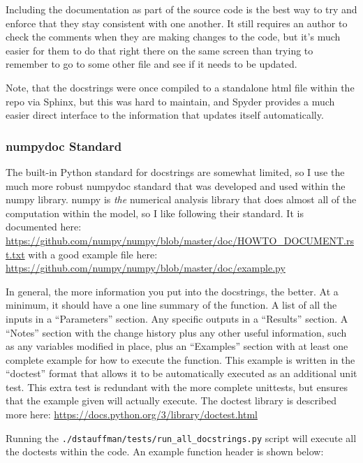 \documentclass[12pt]{article}
\begin{document}
Including the documentation as part of the source code is the best way to try and enforce that they stay consistent with one another.  It still requires an author to check the comments when they are making changes to the code, but it's much easier for them to do that right there on the same screen than trying to remember to go to some other file and see if it needs to be updated.

Note, that the docstrings were once compiled to a standalone html file within the repo via Sphinx, but this was hard to maintain, and Spyder provides a much easier direct interface to the information that updates itself automatically.

\subsubsection{numpydoc Standard}
The built-in Python standard for docstrings are somewhat limited, so I use the much more robust numpydoc standard that was developed and used within the numpy library.  numpy is \emph{the} numerical analysis library that does almost all of the computation within the model, so I like following their standard.  It is documented here: \url{https://github.com/numpy/numpy/blob/master/doc/HOWTO_DOCUMENT.rst.txt} with a good example file here: \url{https://github.com/numpy/numpy/blob/master/doc/example.py}

In general, the more information you put into the docstrings, the better.  At a minimum, it should have a one line summary of the function.  A list of all the inputs in a ``Parameters'' section.  Any specific outputs in a ``Results'' section.  A ``Notes'' section with the change history plus any other useful information, such as any variables modified in place, plus an ``Examples'' section with at least one complete example for how to execute the function.  This example is written in the ``doctest'' format that allows it to be automatically executed as an additional unit test.  This extra test is redundant with the more complete unittests, but ensures that the example given will actually execute.  The doctest library is described more here: \url{https://docs.python.org/3/library/doctest.html}

Running the \texttt{./dstauffman/tests/run\_all\_docstrings.py} script will execute all the doctests within the code.  An example function header is shown below:
\end{document}
